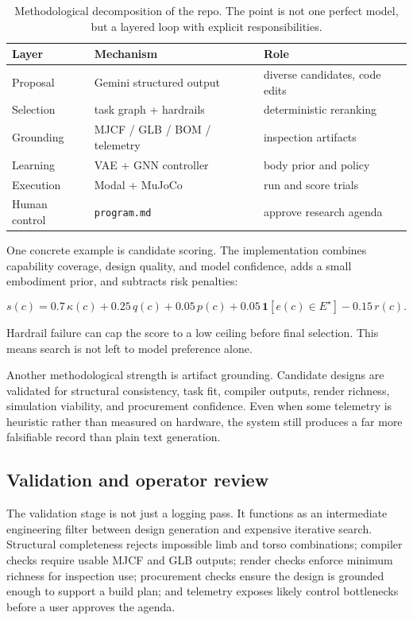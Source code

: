 \documentclass[10pt,letterpaper,twocolumn]{article}
\begin{document}
\begin{table}[t]
\centering
\small
\begin{tabular}{@{}lll@{}}
\toprule
Layer & Mechanism & Role \\
\midrule
Proposal & Gemini structured output & diverse candidates, code edits \\
Selection & task graph + hardrails & deterministic reranking \\
Grounding & MJCF / GLB / BOM / telemetry & inspection artifacts \\
Learning & VAE + GNN controller & body prior and policy \\
Execution & Modal + MuJoCo & run and score trials \\
Human control & \texttt{program.md} & approve research agenda \\
\bottomrule
\end{tabular}
\caption{Methodological decomposition of the repo. The point is not one perfect model, but a layered loop with explicit responsibilities.}
\label{tab:layers}
\end{table}

One concrete example is candidate scoring. The implementation combines capability coverage, design quality, and model confidence, adds a small embodiment prior, and subtracts risk penalties:

\begin{equation}
s(c)=0.7\,\kappa(c)+0.25\,q(c)+0.05\,p(c)+0.05\,\mathbf{1}[e(c)\in E^\star]-0.15\,r(c).
\end{equation}

Hardrail failure can cap the score to a low ceiling before final selection. This means search is not left to model preference alone.

Another methodological strength is artifact grounding. Candidate designs are validated for structural consistency, task fit, compiler outputs, render richness, simulation viability, and procurement confidence. Even when some telemetry is heuristic rather than measured on hardware, the system still produces a far more falsifiable record than plain text generation.

\subsection{Validation and operator review}

The validation stage is not just a logging pass. It functions as an intermediate engineering filter between design generation and expensive iterative search. Structural completeness rejects impossible limb and torso combinations; compiler checks require usable MJCF and GLB outputs; render checks enforce minimum richness for inspection use; procurement checks ensure the design is grounded enough to support a build plan; and telemetry exposes likely control bottlenecks before a user approves the agenda.
\end{document}
